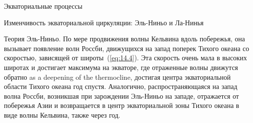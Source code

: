 \begin{chapter}{Экваториальные процессы}
\begin{section}{Изменчивость экваториальной циркуляции: Эль-Ниньо и Ла-Нинья}
\begin{paragraph}{Теория Эль-Ниньо.}
По мере продвижения волны Кельвина вдоль побережья,
она вызывает появление волн Россби, движущихся на запад поперек Тихого океана
со скоростью, зависящей от широты~(\ref{eq:14.4}). Эта скорость очень мала
в высоких широтах и достигает максимума на экваторе, где отраженные волны
движутся обратно as a deepening of the thermocline,
достигая центра экваториальной области Тихого океана год спустя. 
Аналогично, распространяющаяся на запад волна Россби,
возникшая при зарождении Эль-Ниньо на западе, отражается от побережья Азии
и возвращается в центр экваториальной зоны Тихого океана в виде волны Кельвина,
также через год.
%


\end{paragraph}
\end{section}
\end{chapter}
